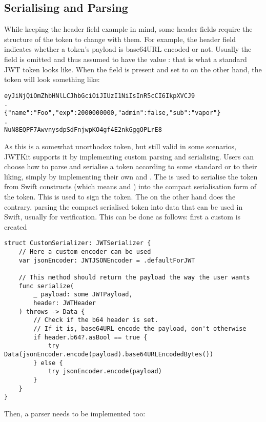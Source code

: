 \subsection{Serialising and Parsing}
While keeping the  header field example in mind, some header fields require the structure of the token to change with them. For example, the  header field indicates whether a token's payload is base64URL encoded or not. Usually the field is omitted and thus assumed to have the value : that is what a standard JWT token looks like. When the field is present and set to  on the other hand, the token will look something like:
\begin{verbatim}
eyJiNjQiOmZhbHNlLCJhbGciOiJIUzI1NiIsInR5cCI6IkpXVCJ9
.
{"name":"Foo","exp":2000000000,"admin":false,"sub":"vapor"}
.
NuN8EQPF7AwvnysdpSdFnjwpKO4gf4E2nkGggOPLrE8
\end{verbatim}
As this is a somewhat unorthodox token, but still valid in some scenarios, JWTKit supports it by implementing custom parsing and serialising. Users can choose how to parse and serialise a token according to some standard or to their liking, simply by implementing their own  and .
The  is used to serialise the token from Swift constructs (which means  and ) into the compact serialisation form of the token. This is used to sign the token. The  on the other hand does the contrary, parsing the compact serialised token into data that can be used in Swift, usually for verification.
This can be done as follows: first a custom  is created
\begin{verbatim}
struct CustomSerializer: JWTSerializer {
    // Here a custom encoder can be used 
    var jsonEncoder: JWTJSONEncoder = .defaultForJWT

    // This method should return the payload the way the user wants
    func serialize(
        _ payload: some JWTPayload, 
        header: JWTHeader
    ) throws -> Data {
        // Check if the b64 header is set. 
        // If it is, base64URL encode the payload, don't otherwise
        if header.b64?.asBool == true {
            try Data(jsonEncoder.encode(payload).base64URLEncodedBytes())
        } else {
            try jsonEncoder.encode(payload)
        }
    }
}
\end{verbatim}
Then, a parser needs to be implemented too:
